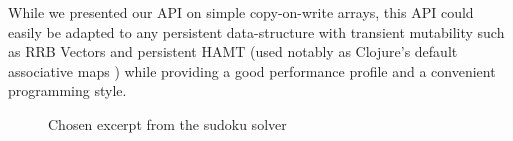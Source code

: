 While we presented our API on simple copy-on-write arrays, this API
could easily be adapted to any persistent data-structure with
transient mutability such as RRB Vectors \cite{DBLP:journals/pacmpl/Puente17}
and persistent HAMT (used notably as Clojure's default associative maps
\cite{bagwell2001ideal,clojurehamt}) while providing a good performance profile
and a convenient programming style.

\begin{figure}
  \centering
  \begin{minipage}[t]{0.45\linewidth}
    
  \end{minipage}\hfill
  \begin{minipage}[t]{0.54\linewidth}
    
  \end{minipage}
  \caption{Chosen excerpt from the sudoku solver}
  \label{ex:sudoku}
\end{figure}


